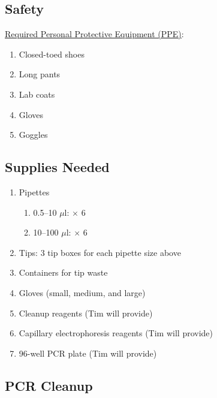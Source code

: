 \documentclass[12pt, hidelinks]{article}
\begin{document}
	\subsection{Safety}

	\underline{Required Personal Protective Equipment (PPE)}:
		\begin{enumerate}
			\item Closed-toed shoes
			\item Long pants
			\item Lab coats
			\item Gloves
			\item Goggles
		\end{enumerate}	
			
	
	\subsection{Supplies Needed}
		\begin{enumerate}
			\item Pipettes
				\begin{enumerate}
					\item 0.5--10 $\mu$l: $\times$ 6
					\item 10--100 $\mu$l: $\times$ 6
				\end{enumerate}
			\item Tips: 3 tip boxes for each pipette size above	
			\item Containers for tip waste
			\item Gloves (small, medium, and large)
			\item Cleanup reagents (Tim will provide)
			\item Capillary electrophoresis reagents (Tim will provide)
			\item 96-well PCR plate (Tim will provide)
	\end{enumerate}	
	
	
	\subsection{PCR Cleanup}	
	
\end{document}
